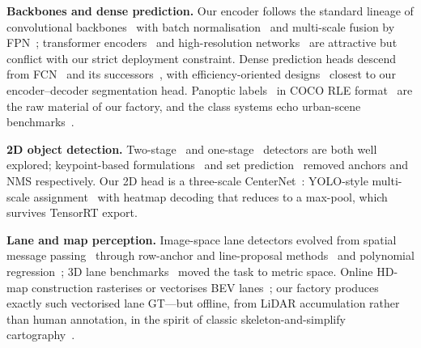 \documentclass[10pt,twocolumn]{article}
\begin{document}
\textbf{Backbones and dense prediction.} Our encoder follows the standard
lineage of convolutional backbones~\citep{simonyan2015vgg,he2016resnet,tan2019efficientnet,liu2022convnext}
with batch normalisation~\citep{ioffe2015bn} and multi-scale fusion by FPN~\citep{lin2017fpn}; transformer
encoders~\citep{dosovitskiy2021vit,liu2021swin} and high-resolution
networks~\citep{wang2020hrnet} are attractive but conflict with our strict
deployment constraint. Dense prediction heads descend from
FCN~\citep{long2015fcn} and its successors~\citep{ronneberger2015unet,zhao2017pspnet,chen2018deeplabv3plus,xie2021segformer},
with efficiency-oriented designs~\citep{yu2018bisenet,romera2018erfnet}
closest to our encoder--decoder segmentation head. Panoptic
labels~\citep{kirillov2019panoptic,cheng2020panopticdeeplab} in COCO RLE
format~\citep{lin2014coco} are the raw material of our factory, and the
class systems echo urban-scene benchmarks~\citep{cordts2016cityscapes,neuhold2017mapillary}.

\textbf{2D object detection.} Two-stage~\citep{ren2015fasterrcnn,he2017maskrcnn}
and one-stage~\citep{liu2016ssd,redmon2016yolo,redmon2018yolov3,lin2017focal,tian2019fcos,zhang2020atss}
detectors are both well explored; keypoint-based
formulations~\citep{law2018cornernet,zhou2019objects} and set
prediction~\citep{carion2020detr,zhu2021deformabledetr} removed anchors and
NMS respectively. Our 2D head is a three-scale CenterNet~\citep{zhou2019objects}:
YOLO-style multi-scale assignment~\citep{redmon2018yolov3} with
heatmap decoding that reduces to a max-pool, which survives TensorRT export.

\textbf{Lane and map perception.} Image-space lane detectors evolved from
spatial message passing~\citep{pan2018scnn} through row-anchor and line-proposal
methods~\citep{qin2020ultrafast,tabelini2021laneatt,liu2021condlanenet,zheng2022clrnet}
and polynomial regression~\citep{tabelini2020polylanenet}; 3D lane
benchmarks~\citep{garnett20193dlanenet,guo2020genlanenet,chen2022persformer}
moved the task to metric space. Online HD-map construction rasterises or
vectorises BEV lanes~\citep{li2022hdmapnet,liu2023vectormapnet,liao2023maptr,liao2023maptrv2,ding2023pivotnet,yuan2024streammapnet};
our factory produces exactly such vectorised lane GT---but offline, from
LiDAR accumulation rather than human annotation, in the spirit of classic
skeleton-and-simplify cartography~\citep{zhang1984thinning,douglas1973dp}.
\end{document}
